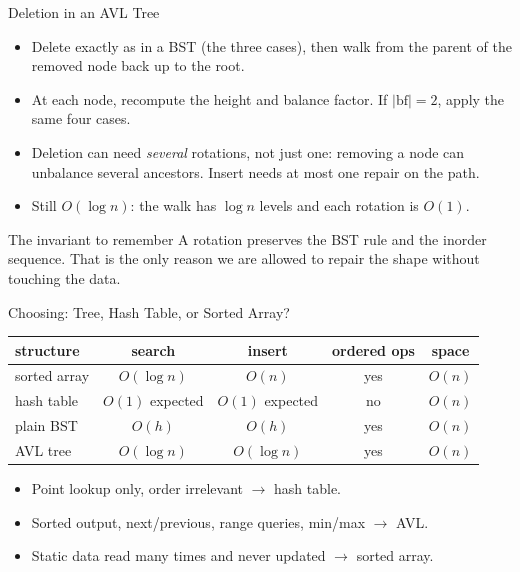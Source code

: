 \documentclass[aspectratio=169]{beamer}
\begin{document}
\begin{frame}{Deletion in an AVL Tree}
  \begin{itemize}
    \item Delete exactly as in a BST (the three cases), then walk from the
      parent of the removed node back up to the root.
    \item At each node, recompute the height and balance factor. If
      $|\mathrm{bf}|=2$, apply the same four cases.
    \item Deletion can need \emph{several} rotations, not just one: removing
      a node can unbalance several ancestors. Insert needs at most one
      repair on the path.
    \item Still $O(\log n)$: the walk has $\log n$ levels and each rotation
      is $O(1)$.
  \end{itemize}
  \begin{exampleblock}{The invariant to remember}
    A rotation preserves the BST rule and the inorder sequence. That is the
    only reason we are allowed to repair the shape without touching the data.
  \end{exampleblock}
\end{frame}

\begin{frame}{Choosing: Tree, Hash Table, or Sorted Array?}
  \begin{center}
  {\footnotesize
  \begin{tabular}{l c c c c}
    \toprule
    \textbf{structure} & \textbf{search} & \textbf{insert} & \textbf{ordered ops} & \textbf{space} \\
    \midrule
    sorted array & $O(\log n)$ & $O(n)$ & yes & $O(n)$ \\
    hash table   & $O(1)$ expected & $O(1)$ expected & no & $O(n)$ \\
    plain BST    & $O(h)$ & $O(h)$ & yes & $O(n)$ \\
    AVL tree     & $O(\log n)$ & $O(\log n)$ & yes & $O(n)$ \\
    \bottomrule
  \end{tabular}}
  \end{center}
  \begin{itemize}
    \item Point lookup only, order irrelevant $\to$ hash table.
    \item Sorted output, next/previous, range queries, min/max $\to$ AVL.
    \item Static data read many times and never updated $\to$ sorted array.
  \end{itemize}
\end{frame}
\end{document}
